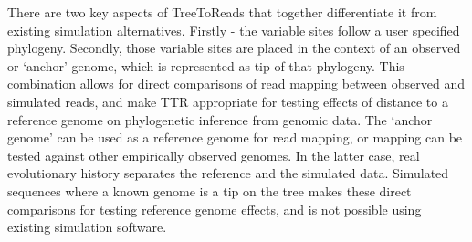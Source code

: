 There are two key aspects of TreeToReads that together differentiate it from existing simulation alternatives.
Firstly - the variable sites follow a user specified phylogeny.
Secondly, those variable sites are placed in the context of an observed or `anchor' genome, which is represented as tip of that phylogeny.
This combination allows for direct comparisons of read mapping between observed and simulated reads, 
and make TTR appropriate for testing effects of distance to a reference genome on phylogenetic inference from genomic data.
The `anchor genome' can be used as a reference genome for read mapping, or mapping can be tested against other empirically observed genomes.
In the latter case, real evolutionary history separates the reference and the simulated data.
Simulated sequences where a known genome is a tip on the tree makes these direct comparisons for testing reference genome effects, 
and is not possible using existing simulation software.


